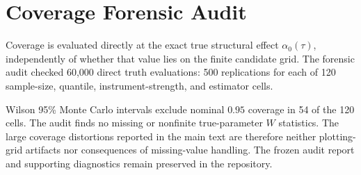 \section{Coverage Forensic Audit}
\label{app:coverage-forensic-audit}

Coverage is evaluated directly at the exact true structural effect $\alpha_0(\tau)$, independently of whether that value lies on the finite candidate grid. The forensic audit checked 60,000 direct truth evaluations: 500 replications for each of 120 sample-size, quantile, instrument-strength, and estimator cells.

Wilson 95\% Monte Carlo intervals exclude nominal $0.95$ coverage in 54 of the 120 cells. The audit finds no missing or nonfinite true-parameter $W$ statistics. The large coverage distortions reported in the main text are therefore neither plotting-grid artifacts nor consequences of missing-value handling. The frozen audit report and supporting diagnostics remain preserved in the repository.
\clearpage
